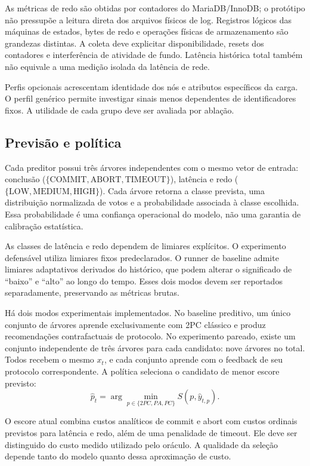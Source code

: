 \documentclass[12pt,a4paper]{article}
\begin{document}
As métricas de redo são obtidas por contadores do MariaDB/InnoDB; o protótipo não pressupõe a leitura direta dos arquivos físicos de log. Registros lógicos das máquinas de estados, bytes de redo e operações físicas de armazenamento são grandezas distintas. A coleta deve explicitar disponibilidade, resets dos contadores e interferência de atividade de fundo. Latência histórica total também não equivale a uma medição isolada da latência de rede.

Perfis opcionais acrescentam identidade dos nós e atributos específicos da carga. O perfil genérico permite investigar sinais menos dependentes de identificadores fixos. A utilidade de cada grupo deve ser avaliada por ablação.

\subsection{Previsão e política}
Cada preditor possui três árvores independentes com o mesmo vetor de entrada: conclusão ($\{\mathrm{COMMIT},\mathrm{ABORT},\mathrm{TIMEOUT}\}$), latência e redo ($\{\mathrm{LOW},\mathrm{MEDIUM},\mathrm{HIGH}\}$). Cada árvore retorna a classe prevista, uma distribuição normalizada de votos e a probabilidade associada à classe escolhida. Essa probabilidade é uma confiança operacional do modelo, não uma garantia de calibração estatística.

As classes de latência e redo dependem de limiares explícitos. O experimento defensável utiliza limiares fixos predeclarados. O runner de baseline admite limiares adaptativos derivados do histórico, que podem alterar o significado de ``baixo'' e ``alto'' ao longo do tempo. Esses dois modos devem ser reportados separadamente, preservando as métricas brutas.

Há dois modos experimentais implementados. No baseline preditivo, um único conjunto de árvores aprende exclusivamente com 2PC clássico e produz recomendações contrafactuais de protocolo. No experimento pareado, existe um conjunto independente de três árvores para cada candidato: nove árvores no total. Todos recebem o mesmo $x_t$, e cada conjunto aprende com o feedback de seu protocolo correspondente. A política seleciona o candidato de menor escore previsto:
\begin{equation}
\widehat{p}_t=\arg\min_{p\in\{2PC,PA,PC\}} S(p,\widehat{y}_{t,p}).
\end{equation}

O escore atual combina custos analíticos de commit e abort com custos ordinais previstos para latência e redo, além de uma penalidade de timeout. Ele deve ser distinguido do custo medido utilizado pelo oráculo. A qualidade da seleção depende tanto do modelo quanto dessa aproximação de custo.
\end{document}
